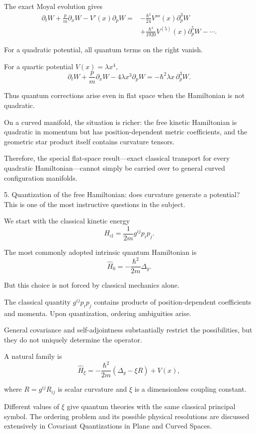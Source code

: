 The exact Moyal evolution gives
\[
\begin{aligned}
\partial_tW+
\frac pm\partial_xW-
V'(x)\partial_pW
={}&-\frac{\hbar^2}{24}V'''(x)
\partial_p^3W\\
&+\frac{\hbar^4}{1920}V^{(5)}(x)
\partial_p^5W-\cdots .
\end{aligned}
\tag{49}
\]

For a quadratic potential, all quantum terms on the right vanish.

For a quartic potential \(V(x)=\lambda x^4\),
\[
\partial_tW+
\frac pm\partial_xW-
4\lambda x^3\partial_pW
=
-\hbar^2\lambda x\,\partial_p^3W.
\tag{50}
\]

Thus quantum corrections arise even in flat space when the Hamiltonian is not quadratic.

On a curved manifold, the situation is richer: the free kinetic Hamiltonian is quadratic in momentum but has position-dependent metric coefficients, and the geometric star product itself contains curvature tensors.

Therefore, the special flat-space result—exact classical transport for every quadratic Hamiltonian—cannot simply be carried over to general curved configuration manifolds.

5. Quantization of the free Hamiltonian: does curvature generate a potential?
This is one of the most instructive questions in the subject.

We start with the classical kinetic energy
\[
H_{\mathrm{cl}}=\frac1{2m}g^{ij}p_ip_j.
\tag{51}
\]

The most commonly adopted intrinsic quantum Hamiltonian is
\[
\boxed{
\widehat H_0=-\frac{\hbar^2}{2m}\Delta_g.
}
\tag{52}
\]

But this choice is not forced by classical mechanics alone.

The classical quantity \(g^{ij}p_ip_j\) contains products of position-dependent coefficients and momenta. Upon quantization, ordering ambiguities arise.

General covariance and self-adjointness substantially restrict the possibilities, but they do not uniquely determine the operator.

A natural family is
\[
\boxed{
\widehat H_\xi
=
-\frac{\hbar^2}{2m}
\left(\Delta_g-\xi R\right)+V(x),
}
\tag{53}
\]

where \(R=g^{ij}R_{ij}\) is scalar curvature and \(\xi\) is a dimensionless coupling constant.

Different values of \(\xi\) give quantum theories with the same classical principal symbol. The ordering problem and its possible physical resolutions are discussed extensively in Covariant Quantizations in Plane and Curved Spaces. 


